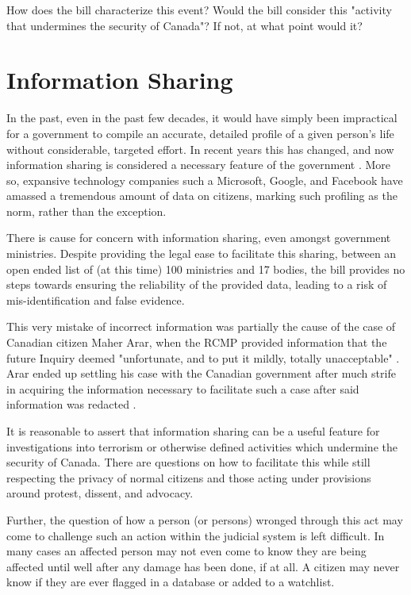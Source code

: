 \documentclass[a4paper, 11pt]{article} %
\begin{document}
How does the bill characterize this event? Would the bill consider this "activity that undermines the security of Canada"? If not, at what point would it?

\section*{Information Sharing}
In the past, even in the past few decades, it would have simply been impractical for a government to compile an accurate, detailed profile of a given person's life without considerable, targeted effort. In recent years this has changed, and now information sharing is considered a necessary feature of the government \cite{total-awareness}. More so, expansive technology companies such a Microsoft, Google, and Facebook have amassed a tremendous amount of data on citizens, marking such profiling as the norm, rather than the exception.

There is cause for concern with information sharing, even amongst government ministries. Despite providing the legal ease to facilitate this sharing, between an open ended list of (at this time) 100 ministries and 17 bodies, the bill provides no steps towards ensuring the reliability of the provided data, leading to a risk of mis-identification and false evidence.

This very mistake of incorrect information was partially the cause of the case of Canadian citizen Maher Arar, when the RCMP provided information that the future Inquiry deemed "unfortunate, and to put it mildly, totally unacceptable" \cite{arar}. Arar ended up settling his case with the Canadian government after much strife in acquiring the information necessary to facilitate such a case after said information was redacted \cite{arar_canada_2007}.

It is reasonable to assert that information sharing can be a useful feature for investigations into terrorism or otherwise defined activities which undermine the security of Canada. There are questions on how to facilitate this while still respecting the privacy of normal citizens and those acting under provisions around protest, dissent, and advocacy.

Further, the question of how a person (or persons) wronged through this act may come to challenge such an action within the judicial system is left difficult. In many cases an affected person may not even come to know they are being affected until well after any damage has been done, if at all. A citizen may never know if they are ever flagged in a database or added to a watchlist.
\end{document}

